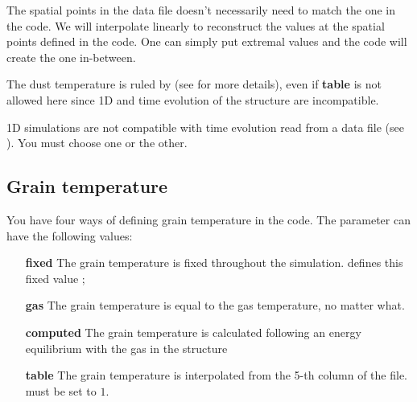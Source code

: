 \documentclass[english,a4paper,twoside]{article}
\begin{document}
The spatial points in the data file doesn't necessarily need to match the one in the code. We will interpolate linearly to reconstruct the values at the spatial points defined in the code. One can simply put extremal values and the code will create the one in-between. 

The dust temperature is ruled by  (see  for more details), even if \textbf{table} is not allowed here since 1D and time evolution of the structure are incompatible.

\begin{attention}
1D simulations are not compatible with time evolution read from a data file (see ). You must choose one or the other.
\end{attention}

\subsection{Grain temperature}\label{sec:dust_temp}
You have four ways of defining grain temperature in the code. The parameter  can have the following values:
\begin{itemize}
\item[\textbf{fixed}] The grain temperature is fixed throughout the simulation.  defines this fixed value ;
\item[\textbf{gas}] The grain temperature is equal to the gas temperature, no matter what.
\item[\textbf{computed}] The grain temperature is calculated following an energy equilibrium with the gas in the structure
\item[\textbf{table}] The grain temperature is interpolated from the 5-th column of the   file.  must be set to $1$.
\end{itemize}
\end{document}
